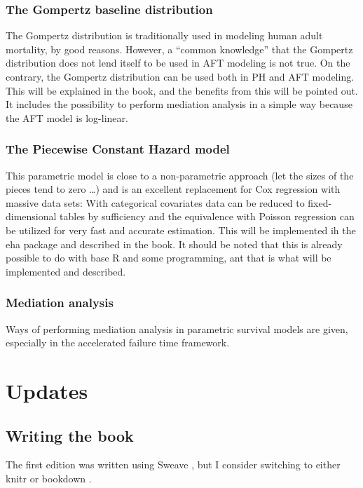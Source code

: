 \documentclass[a4paper,11pt]{article}
\begin{document}
\subsubsection{The Gompertz baseline distribution}

The Gompertz distribution is traditionally used in modeling human adult
mortality, by good reasons. However, a ``common knowledge'' that the
Gompertz distribution does not lend itself to be used in AFT modeling is
not true. On the contrary, the Gompertz distribution can be used both in PH
and AFT modeling. This will be explained in the book, and the benefits from
this will be pointed out. It includes the possibility to perform mediation
analysis in a simple way because the AFT model is log-linear.


\subsubsection{The Piecewise Constant Hazard model}

This parametric model is close to a non-parametric approach (let the sizes
of the pieces tend to zero \ldots) and is an excellent replacement for Cox
regression with massive data sets: With categorical covariates data can be
reduced to fixed-dimensional tables by sufficiency and the equivalence
with Poisson regression can be utilized for very fast and accurate
estimation. This will be implemented ih the eha package and described in
the book. It should be noted that this is already possible to do with base R
and some programming, ant that is what will be implemented and described.   

\subsubsection{Mediation analysis}

Ways of performing mediation analysis in parametric survival models are
given, especially in the accelerated failure time framework.


\section{Updates} \label{sec:updates}

\subsection{Writing the book}

The first edition was written using Sweave \citep{sweave02}, but I consider
switching to either knitr \citep{knitr15} or bookdown \citep{bookdown16}.
\end{document}
